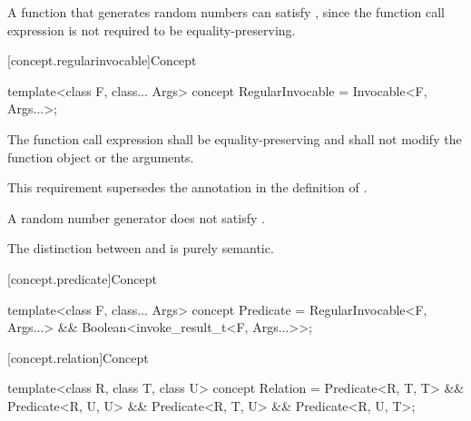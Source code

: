 \begin{itemdescr}
\pnum
\begin{example}
A function that generates random numbers can satisfy ,
since the  function call expression is not required to be
equality-preserving.
\end{example}
\end{itemdescr}

[concept.regularinvocable]{Concept }

%
\begin{itemdecl}
template<class F, class... Args>
  concept RegularInvocable = Invocable<F, Args...>;
\end{itemdecl}

\begin{itemdescr}
\pnum
The  function call expression shall be equality-preserving and
shall not modify the function object or the
arguments.
\begin{note}
This requirement supersedes the annotation in the definition of
.
\end{note}

\pnum
\begin{example}
A random number generator does not satisfy
.
\end{example}

\pnum
\begin{note}
The distinction between  and 
is purely semantic.
\end{note}
\end{itemdescr}

[concept.predicate]{Concept }

%
\begin{itemdecl}
template<class F, class... Args>
  concept Predicate = RegularInvocable<F, Args...> && Boolean<invoke_result_t<F, Args...>>;
\end{itemdecl}

[concept.relation]{Concept }

%
\begin{itemdecl}
template<class R, class T, class U>
  concept Relation =
    Predicate<R, T, T> && Predicate<R, U, U> &&
    Predicate<R, T, U> && Predicate<R, U, T>;
\end{itemdecl}

